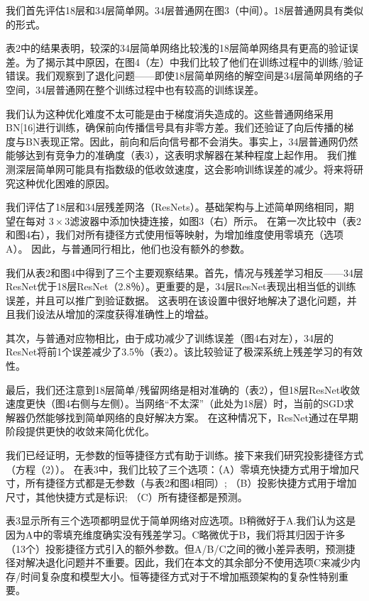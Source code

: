 
我们首先评估18层和34层简单网。34层普通网在图3（中间）。18层普通网具有类似的形式。

表2中的结果表明，较深的34层简单网络比较浅的18层简单网络具有更高的验证误差。为了揭示其中原因，在图4（左）中我们比较了他们在训练过程中的训练/验证错误。我们观察到了退化问题——即使18层简单网络的解空间是34层简单网络的子空间，34层普通网在整个训练过程中也有较高的训练误差。

我们认为这种优化难度不太可能是由于梯度消失造成的。这些普通网络采用BN[16]进行训练，确保前向传播信号具有非零方差。我们还验证了向后传播的梯度与BN表现正常。因此，前向和后向信号都不会消失。事实上，34层普通网仍然能够达到有竞争力的准确度（表3），这表明求解器在某种程度上起作用。 我们推测深层简单网可能具有指数级的低收敛速度，这会影响训练误差的减少。将来将研究这种优化困难的原因。


我们评估了18层和34层残差网洛（ResNets）。基础架构与上述简单网络相同，期望在每对 $3 \times 3$滤波器中添加快捷连接，如图3（右）所示。 在第一次比较中（表2和图4右），我们对所有捷径方式使用恒等映射，为增加维度使用零填充（选项A）。 因此，与普通同行相比，他们也没有额外的参数。

我们从表2和图4中得到了三个主要观察结果。首先，情况与残差学习相反——34层ResNet优于18层ResNet（2.8％）。更重要的是，34层ResNet表现出相当低的训练误差，并且可以推广到验证数据。 这表明在该设置中很好地解决了退化问题，并且我们设法从增加的深度获得准确性上的增益。

其次，与普通对应物相比，由于成功减少了训练误差（图4右对左），34层的ResNet将前1个误差减少了3.5％（表2）。该比较验证了极深系统上残差学习的有效性。

最后，我们还注意到18层简单/残留网络是相对准确的（表2），但18层ResNet收敛速度更快（图4右侧与左侧）。当网络“不太深”（此处为18层）时，当前的SGD求解器仍然能够找到简单网络的良好解决方案。 在这种情况下，ResNet通过在早期阶段提供更快的收敛来简化优化。


我们已经证明，无参数的恒等捷径方式有助于训练。接下来我们研究投影捷径方式（方程（2））。 在表3中，我们比较了三个选项：（A）零填充快捷方式用于增加尺寸，所有捷径方式都是无参数（与表2和图4相同）; （B）投影快捷方式用于增加尺寸，其他快捷方式是标识; （C）所有捷径都是预测。

表3显示所有三个选项都明显优于简单网络对应选项。B稍微好于A.我们认为这是因为A中的零填充维度确实没有残差学习。C略微优于B，我们将其归因于许多（13个）投影捷径方式引入的额外参数。但A/B/C之间的微小差异表明，预测捷径对解决退化问题并不重要。因此，我们在本文的其余部分不使用选项C来减少内存/时间复杂度和模型大小。恒等捷径方式对于不增加瓶颈架构的复杂性特别重要。
